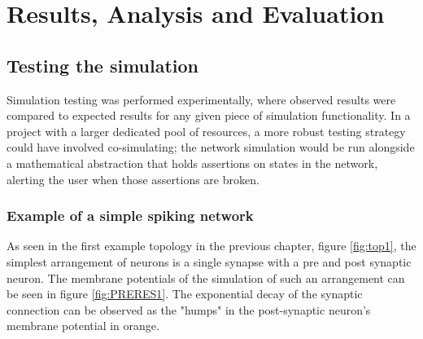 \chapter{Results, Analysis and Evaluation}

\setlength{\epigraphwidth}{0.43\textwidth}

\section{Testing the simulation}
\label{Testingthesimulation}

Simulation testing was performed experimentally, where observed results were
compared to expected results for any given piece of simulation functionality. In
a project with a larger dedicated pool of resources, 
a more robust testing strategy could have involved co-simulating; the
network simulation would be run alongside a mathematical abstraction that holds
assertions on states in the network, alerting the user when those assertions
are broken.

\subsection{Example of a simple spiking network}

As seen in the first example topology in the previous chapter, figure
\ref{fig:top1}, the simplest arrangement of neurons is a single synapse with a
pre and post synaptic neuron. The membrane potentials of the simulation of such
an arrangement can be seen in figure \ref{fig:PRERES1}. The exponential decay of
the synaptic connection can be observed as the "humps" in the post-synaptic
neuron's membrane potential in orange.


